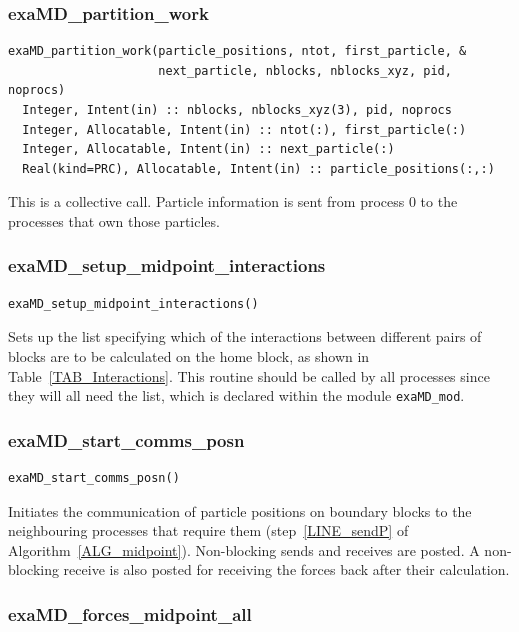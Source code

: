 \documentclass[paper=a4, fontsize=11pt,bibtotoc]{scrartcl}		%
\newcommand{\TT}[1]{\texttt{#1}}
\begin{document}
\subsubsection{exaMD\_partition\_work}

\begin{verbatim}
exaMD_partition_work(particle_positions, ntot, first_particle, &
                     next_particle, nblocks, nblocks_xyz, pid, noprocs)
  Integer, Intent(in) :: nblocks, nblocks_xyz(3), pid, noprocs
  Integer, Allocatable, Intent(in) :: ntot(:), first_particle(:)
  Integer, Allocatable, Intent(in) :: next_particle(:)
  Real(kind=PRC), Allocatable, Intent(in) :: particle_positions(:,:)
\end{verbatim}
This is a collective call. Particle information is sent from process 0 to the processes that own those particles.

\subsubsection{exaMD\_setup\_midpoint\_interactions}

\begin{verbatim}
exaMD_setup_midpoint_interactions()
\end{verbatim}
Sets up the list specifying which of the interactions between different pairs of blocks are to be calculated on the home block, as shown in 
Table~\ref{TAB_Interactions}. This routine should be called by all processes since they will all need the list, which is declared within the 
module \TT{exaMD\_mod}.

\subsubsection{exaMD\_start\_comms\_posn}

\begin{verbatim}
exaMD_start_comms_posn()
\end{verbatim}
Initiates the communication of particle positions on boundary blocks to the neighbouring processes that require them (step~\ref{LINE_sendP} of 
Algorithm~\ref{ALG_midpoint}). Non-blocking sends and receives are posted. A non-blocking receive is also posted for receiving the forces back 
after their calculation.

\subsubsection{exaMD\_forces\_midpoint\_all}
\end{document}
